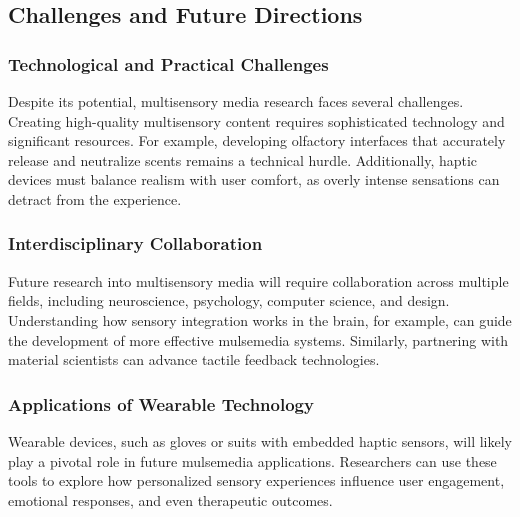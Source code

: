 \documentclass[
]{book}
\begin{document}
\subsection{Challenges and Future Directions}\label{challenges-and-future-directions}

\subsubsection{Technological and Practical Challenges}\label{technological-and-practical-challenges}

Despite its potential, multisensory media research faces several challenges. Creating high-quality multisensory content requires sophisticated technology and significant resources. For example, developing olfactory interfaces that accurately release and neutralize scents remains a technical hurdle. Additionally, haptic devices must balance realism with user comfort, as overly intense sensations can detract from the experience.

\subsubsection{Interdisciplinary Collaboration}\label{interdisciplinary-collaboration}

Future research into multisensory media will require collaboration across multiple fields, including neuroscience, psychology, computer science, and design. Understanding how sensory integration works in the brain, for example, can guide the development of more effective mulsemedia systems. Similarly, partnering with material scientists can advance tactile feedback technologies.

\subsubsection{Applications of Wearable Technology}\label{applications-of-wearable-technology}

Wearable devices, such as gloves or suits with embedded haptic sensors, will likely play a pivotal role in future mulsemedia applications. Researchers can use these tools to explore how personalized sensory experiences influence user engagement, emotional responses, and even therapeutic outcomes.
\end{document}
